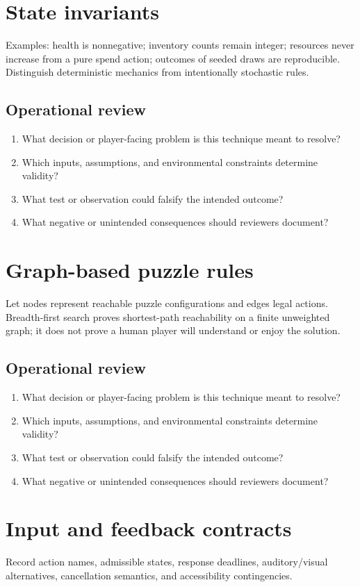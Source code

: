 \documentclass[11pt]{article}
\begin{document}
\section{State invariants}
Examples: health is nonnegative; inventory counts remain integer; resources never increase from a pure spend action; outcomes of seeded draws are reproducible. Distinguish deterministic mechanics from intentionally stochastic rules.


\subsection{Operational review}
\begin{enumerate}
\item What decision or player-facing problem is this technique meant to resolve?
\item Which inputs, assumptions, and environmental constraints determine validity?
\item What test or observation could falsify the intended outcome?
\item What negative or unintended consequences should reviewers document?
\end{enumerate}

\section{Graph-based puzzle rules}
Let nodes represent reachable puzzle configurations and edges legal actions. Breadth-first search proves shortest-path reachability on a finite unweighted graph; it does not prove a human player will understand or enjoy the solution.


\subsection{Operational review}
\begin{enumerate}
\item What decision or player-facing problem is this technique meant to resolve?
\item Which inputs, assumptions, and environmental constraints determine validity?
\item What test or observation could falsify the intended outcome?
\item What negative or unintended consequences should reviewers document?
\end{enumerate}

\section{Input and feedback contracts}
Record action names, admissible states, response deadlines, auditory/visual alternatives, cancellation semantics, and accessibility contingencies.
\end{document}
